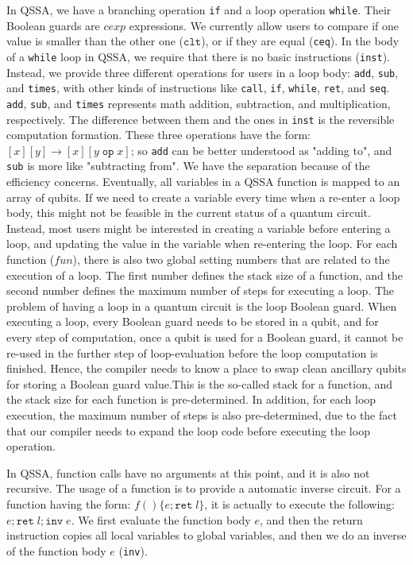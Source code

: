 In QSSA, we have a branching operation \texttt{if} and a loop operation \texttt{while}. Their Boolean guards are $cexp$ expressions. We currently allow users to compare if one value is smaller than the other one ($\texttt{clt}$), or if they are equal (\texttt{ceq}). 
In the body of a \texttt{while} loop in QSSA, we require that there is no basic instructions (\texttt{inst}). Instead, we provide three different operations for users in a loop body: \texttt{add}, \texttt{sub}, and \texttt{times}, with other kinds of instructions like \texttt{call}, \texttt{if}, \texttt{while}, \texttt{ret}, and \texttt{seq}. \texttt{add}, \texttt{sub}, and \texttt{times} represents math addition, subtraction, and multiplication, respectively. The difference between them and the ones in \texttt{inst} is the reversible computation formation. These three operations have the form: $[x][y]\rightarrow[x][y\;\texttt{op}\;x]$; so \texttt{add} can be better understood as "adding to", and \texttt{sub} is more like "subtracting from". We have the separation because of the efficiency concerns. Eventually, all variables in a QSSA function is mapped to an array of qubits. If we need to create a variable every time when a re-enter a loop body, this might not be feasible in the current status of a quantum circuit. Instead, most users might be interested in creating a variable before entering a loop, and updating the value in the variable when re-entering the loop. 
For each function ($fun$), there is also two global setting numbers that are related to the execution of a loop. The first number defines the stack size of a function, and the second number defines the maximum number of steps for executing a loop. The problem of having a loop in a quantum circuit is the loop Boolean guard. When executing a loop, every Boolean guard needs to be stored in a qubit, and for every step of computation, once a qubit is used for a Boolean guard, it cannot be re-used in the further step of loop-evaluation before the loop computation is finished. Hence, the compiler needs to know a place to swap clean ancillary qubits for storing a Boolean guard value.This is the so-called stack for a function, and the stack size for each function is pre-determined. In addition, for each loop execution, the maximum number of steps is also pre-determined, due to the fact that our compiler needs to expand the loop code before executing the loop operation.

In QSSA, function calls have no arguments at this point, and it is also not recursive. The usage of a function is to provide a automatic inverse circuit. For a function having the form: $f()\{e;\texttt{ret}\; l\}$, it is actually to execute the following: $e;\texttt{ret}\; l;\texttt{inv}\;e$. We first evaluate the function body $e$, and then the return instruction copies all local variables to global variables, and then we do an inverse of the function body $e$ (\texttt{inv}). 

